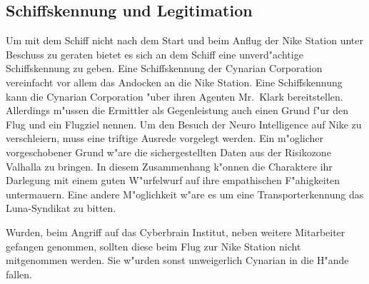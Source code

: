 \subsection{Schiffskennung und Legitimation}
Um mit dem Schiff nicht nach dem Start und beim Anflug der Nike Station unter Beschuss zu geraten bietet es sich an dem Schiff eine unverd"achtige Schiffskennung zu geben. Eine Schiffskennung der Cynarian Corporation vereinfacht vor allem das Andocken an die Nike Station. Eine Schiffskennung kann die Cynarian Corporation "uber ihren Agenten Mr.~Klark bereitstellen. Allerdings m"ussen die Ermittler als Gegenleistung auch einen Grund f"ur den Flug und ein Flugziel nennen. Um den Besuch der Neuro Intelligence auf Nike zu verschleiern, muss eine triftige Ausrede vorgelegt werden. Ein m"oglicher vorgeschobener Grund w"are die sichergestellten Daten aus der Risikozone Valhalla zu bringen. In diesem Zusammenhang k"onnen die Charaktere ihr Darlegung mit einem guten W"urfelwurf auf ihre empathischen F"ahigkeiten untermauern. Eine andere M"oglichkeit w"are es um eine Transporterkennung das Luna-Syndikat zu bitten.

\begin{remarks}
    Wurden, beim Angriff auf das Cyberbrain Institut, neben \ml{} weitere Mitarbeiter gefangen genommen, sollten diese beim Flug zur Nike Station nicht mitgenommen werden. Sie w"urden sonst unweigerlich Cynarian in die H"ande fallen.
\end{remarks}

